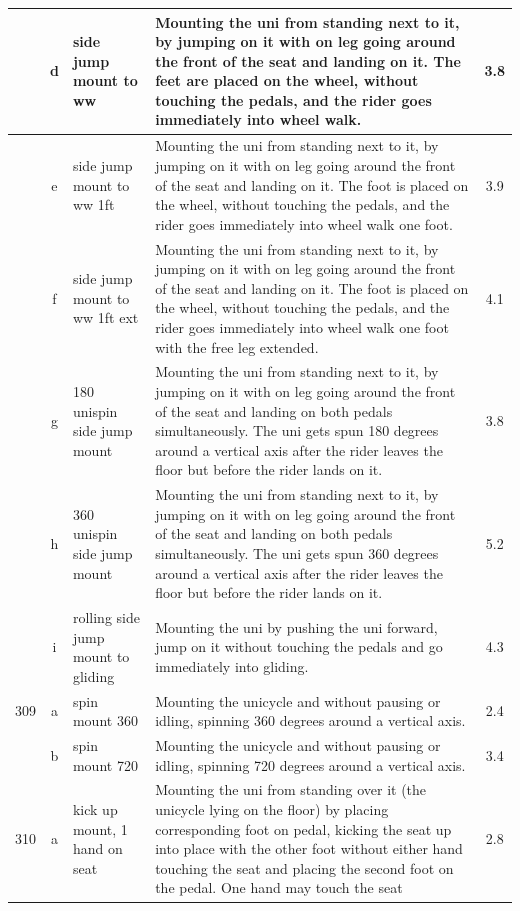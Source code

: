 \begin{longtable}{|r|c|p{4cm}|p{8cm}|c|}
\hline
  & d & side jump mount to ww & Mounting the uni from standing next to it, by jumping on it with on leg going around the front of the seat and landing on it. The feet are placed on the wheel, without touching the pedals, and the rider goes immediately into wheel walk.  & 3.8 \\ 
\hline
  & e & side jump mount to ww 1ft & Mounting the uni from standing next to it, by jumping on it with on leg going around the front of the seat and landing on it. The foot is placed on the wheel, without touching the pedals, and the rider goes immediately into wheel walk one foot.  & 3.9 \\ 
\hline
  & f & side jump mount to ww 1ft ext & Mounting the uni from standing next to it, by jumping on it with on leg going around the front of the seat and landing on it. The foot is placed on the wheel, without touching the pedals, and the rider goes immediately into wheel walk one foot with the free leg extended. & 4.1 \\ 
\hline
  & g & 180 unispin side jump mount & Mounting the uni from standing next to it, by jumping on it with on leg going around the front of the seat and landing on both pedals simultaneously. The uni gets spun 180 degrees around a vertical axis after the rider leaves the floor but before the rider lands on it. & 3.8 \\ 
\hline
  & h & 360 unispin side jump mount & Mounting the uni from standing next to it, by jumping on it with on leg going around the front of the seat and landing on both pedals simultaneously. The uni gets spun 360 degrees around a vertical axis after the rider leaves the floor but before the rider lands on it. & 5.2 \\ 
\hline
  & i & rolling side jump mount to gliding  & Mounting the uni by pushing the uni forward, jump on it without touching the pedals and go immediately into gliding.  & 4.3 \\ 
\hline
309 & a & spin mount 360  & Mounting the unicycle and without pausing or idling, spinning 360 degrees around a vertical axis. & 2.4 \\ 
\hline
  & b & spin mount 720  & Mounting the unicycle and without pausing or idling, spinning 720 degrees around a vertical axis. & 3.4 \\ 
\hline
310 & a & kick up mount, 1 hand on seat & Mounting the uni from standing over it (the unicycle lying on the floor) by placing corresponding foot on pedal, kicking the seat up into place with the other foot without either hand touching the seat and placing the second foot on the pedal. One hand may touch the seat & 2.8 \\ 

\end{longtable}
